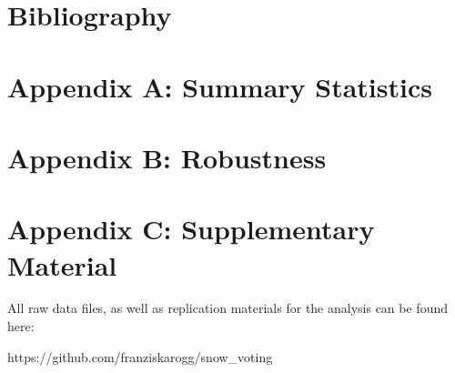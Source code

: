 \documentclass{article}
\begin{document}
\newpage

\section*{Bibliography}
\printbibliography[heading=none]


\newpage

\section*{Appendix A: Summary Statistics}
\label{app:A}

\begin{table}[H]
  \caption{\textit{Descriptive Statistics of Main Variables}}
  \label{tab:summary}
  
\end{table}

\newpage

\section*{Appendix B: Robustness}
\label{app:B}

\begin{table}[H]
  \caption{\textit{Robustness: Maximum Snow Depth (2023/24)}}
  \label{tab:robustness}
  
\end{table}
\newpage



\section*{Appendix C: Supplementary Material}

\noindent All raw data files, as well as replication materials for the analysis can be found here: 

\noindent https://github.com/franziskarogg/snow\_voting
\end{document}
